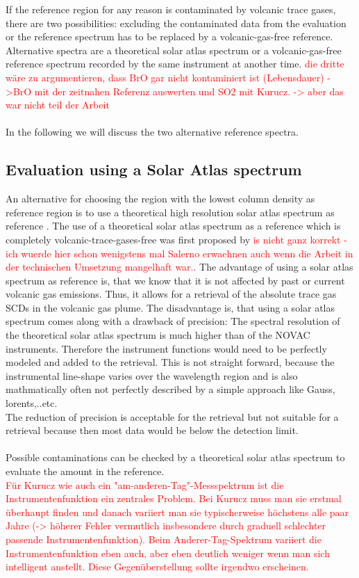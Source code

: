 If the reference region for any reason is
contaminated by volcanic trace gases, there are two possibilities: excluding the contaminated data from the evaluation or the reference spectrum has to be
replaced by a volcanic-gas-free reference. Alternative spectra are a
theoretical solar atlas spectrum or a volcanic-gas-free reference
spectrum recorded by the same instrument at another time.
\textcolor{red}{die dritte wäre zu argumentieren, dass BrO gar nicht kontaminiert ist (Lebensdauer) ->BrO mit der zeitnahen Referenz auswerten und SO2 mit Kurucz. -> aber das war nicht teil der Arbeit}\\ 
%
\\
%
In the following we will discuss the two alternative reference spectra.
%
\subsection*{Evaluation using a Solar Atlas spectrum \label{kuruz}}
An alternative for choosing the region with the lowest column density as reference region is to use a theoretical high resolution solar atlas spectrum as reference \citep{chance2010improved}.
The use of a theoretical solar atlas spectrum as a reference which is completely volcanic-trace-gases-free was first proposed by \textcolor{red}{is nicht ganz korrekt - ich wuerde hier schon wenigstens mal Salerno erwaehnen auch wenn die Arbeit in der technischen Umsetzung mangelhaft war.}\citep{lubcke2014bro}.
The advantage of using a solar atlas spectrum as reference is, that we know that it is not affected by past or current volcanic gas emissions. Thus, it allows for a retrieval of the absolute trace gas SCDs in the volcanic gas plume. The disadvantage is, that using a solar atlas spectrum comes along with a drawback of precision: The spectral resolution of the theoretical solar atlas spectrum is much  higher than of the NOVAC instruments. Therefore the instrument functions would need to be perfectly modeled and added to the retrieval. This is not straight forward, because the instrumental line-shape varies over the wavelength region and is also mathmatically often not perfectly described by a simple approach like Gauss, lorents,..etc.\\ 
The reduction of precision is acceptable for the
 retrieval but not suitable for a  retrieval because then most data would be below the detection limit.\\
%
\\
%
Possible contaminations can be checked
by a theoretical solar atlas spectrum to evaluate the  amount in the reference.\\
\textcolor{red}{Für Kurucz wie auch ein "am-anderen-Tag"-Messspektrum ist die Instrumentenfunktion ein zentrales Problem. Bei Kurucz muss man sie erstmal überhaupt finden und danach variiert man sie typischerweise höchstens alle paar Jahre (-> höherer Fehler vermutlich insbesondere durch graduell schlechter passende Instrumentenfunktion). Beim Anderer-Tag-Spektrum variiert die Instrumentenfunktion eben auch, aber eben deutlich weniger wenn man sich intelligent anstellt.
	Diese Gegenüberstellung sollte irgendwo erscheinen.}
%
